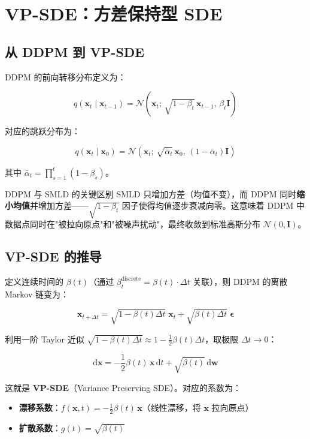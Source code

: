 \section{VP-SDE：方差保持型 SDE}

\subsection{从 DDPM 到 VP-SDE}

DDPM 的前向转移分布定义为：

$$
q(\mathbf{x}_t \mid \mathbf{x}_{t-1}) = \mathcal{N}\!\left(\mathbf{x}_t;\, \sqrt{1-\beta_t}\,\mathbf{x}_{t-1},\, \beta_t \mathbf{I}\right)
$$

对应的跳跃分布为：

$$
q(\mathbf{x}_t \mid \mathbf{x}_0) = \mathcal{N}\!\left(\mathbf{x}_t;\, \sqrt{\bar{\alpha}_t}\,\mathbf{x}_0,\, (1 - \bar{\alpha}_t)\mathbf{I}\right)
$$

其中 $\bar{\alpha}_t = \prod_{s=1}^{t}(1-\beta_s)$。

\begin{warningbox}{DDPM 与 SMLD 的关键区别}
SMLD 只增加方差（均值不变），而 DDPM 同时\textbf{缩小均值}并增加方差——$\sqrt{1-\beta_t}$ 因子使得均值逐步衰减向零。这意味着 DDPM 中数据点同时在"被拉向原点"和"被噪声扰动"，最终收敛到标准高斯分布 $\mathcal{N}(0, \mathbf{I})$。
\end{warningbox}

\subsection{VP-SDE 的推导}

定义连续时间的 $\beta(t)$（通过 $\beta_t^{\text{discrete}} = \beta(t) \cdot \Delta t$ 关联），则 DDPM 的离散 Markov 链变为：

$$
\mathbf{x}_{t+\Delta t} = \sqrt{1 - \beta(t)\Delta t}\;\mathbf{x}_t + \sqrt{\beta(t)\Delta t}\;\boldsymbol{\epsilon}
$$

利用一阶 Taylor 近似 $\sqrt{1 - \beta(t)\Delta t} \approx 1 - \frac{1}{2}\beta(t)\Delta t$，取极限 $\Delta t \to 0$：

$$
\mathrm{d}\mathbf{x} = -\frac{1}{2}\beta(t)\,\mathbf{x}\,\mathrm{d}t + \sqrt{\beta(t)}\,\mathrm{d}\mathbf{w}
$$

这就是 \textbf{VP-SDE}（Variance Preserving SDE）。对应的系数为：

\begin{itemize}
    \item \textbf{漂移系数}：$f(\mathbf{x}, t) = -\frac{1}{2}\beta(t)\,\mathbf{x}$（线性漂移，将 $\mathbf{x}$ 拉向原点）
    \item \textbf{扩散系数}：$g(t) = \sqrt{\beta(t)}$
\end{itemize}

